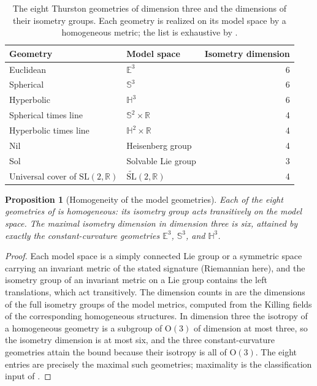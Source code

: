 \documentclass[11pt,letterpaper]{article}
\newtheorem{proposition}[theorem]{Proposition}
\theoremstyle{definition}
\theoremstyle{remark}
\begin{document}
\begin{table}[t]
\centering
\caption{The eight Thurston geometries of dimension three and the dimensions of their isometry groups. Each geometry is realized on its model space by a homogeneous metric; the list is exhaustive by .}
\label{tab:geometries}
\small
\begin{tabular}{llr}
\toprule
Geometry & Model space & Isometry dimension \\
\midrule
Euclidean & $\mathbb{E}^3$ & 6 \\
Spherical & $\mathbb{S}^3$ & 6 \\
Hyperbolic & $\mathbb{H}^3$ & 6 \\
Spherical times line & $\mathbb{S}^2 \times \mathbb{R}$ & 4 \\
Hyperbolic times line & $\mathbb{H}^2 \times \mathbb{R}$ & 4 \\
Nil & Heisenberg group & 4 \\
Sol & Solvable Lie group & 3 \\
Universal cover of $\mathrm{SL}(2, \mathbb{R})$ & $\widetilde{\mathrm{SL}}(2, \mathbb{R})$ & 4 \\
\bottomrule
\end{tabular}
\end{table}

\begin{proposition}[Homogeneity of the model geometries]\label{prop:homogeneous}
Each of the eight geometries of  is homogeneous: its isometry group acts transitively on the model space. The maximal isometry dimension in dimension three is six, attained by exactly the constant-curvature geometries $\mathbb{E}^3$, $\mathbb{S}^3$, and $\mathbb{H}^3$.
\end{proposition}

\begin{proof}
Each model space is a simply connected Lie group or a symmetric space carrying an invariant metric of the stated signature (Riemannian here), and the isometry group of an invariant metric on a Lie group contains the left translations, which act transitively. The dimension counts in  are the dimensions of the full isometry groups of the model metrics, computed from the Killing fields of the corresponding homogeneous structures. In dimension three the isotropy of a homogeneous geometry is a subgroup of $\mathrm{O}(3)$ of dimension at most three, so the isometry dimension is at most six, and the three constant-curvature geometries attain the bound because their isotropy is all of $\mathrm{O}(3)$. The eight entries are precisely the maximal such geometries; maximality is the classification input of  \cite{thurston1982}.
\end{proof}
\end{document}

